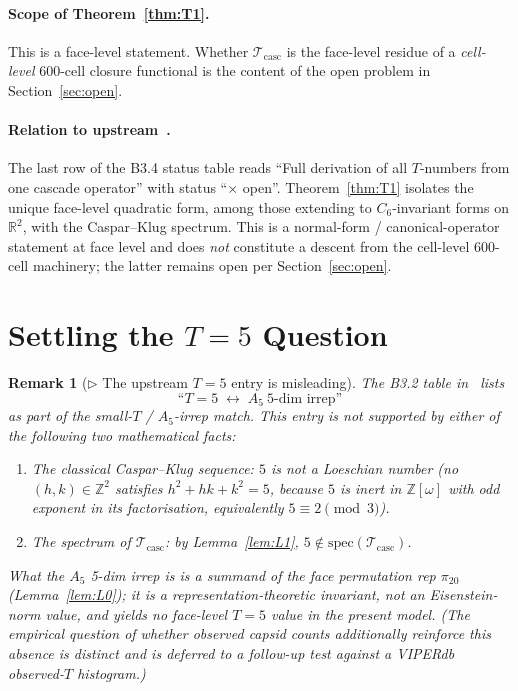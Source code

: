 \documentclass[12pt]{article}
\newtheorem{remark}[theorem]{Remark}
\newcommand{\Tcasc}{\mathcal{T}_{\mathrm{casc}}}
\newcommand{\Zom}{\mathbb{Z}[\omega]}
\begin{document}
\paragraph{Scope of Theorem~\ref{thm:T1}.} This is a face-level
statement. Whether $\Tcasc$ is the face-level residue of a
\emph{cell-level} 600-cell closure functional is the content of the
open problem in Section~\ref{sec:open}.

\paragraph{Relation to upstream~\cite[\S B3.4]{CascadeBio}.} The last
row of the B3.4 status table reads ``Full derivation of all $T$-numbers
from one cascade operator'' with status ``$\times$ open''.
Theorem~\ref{thm:T1} isolates the unique face-level quadratic
form, among those extending to $C_6$-invariant forms on
$\mathbb{R}^2$, with the Caspar--Klug spectrum. This is a
normal-form / canonical-operator statement at face level and does
\emph{not} constitute a descent from the cell-level 600-cell
machinery; the latter remains open per Section~\ref{sec:open}.

\section{Settling the $T = 5$ Question}\label{sec:t5}

\begin{remark}[$\triangleright$ The upstream $T = 5$ entry is misleading]\label{rem:R1}
The B3.2 table in~\cite[\S B3.2]{CascadeBio} lists
\[
\text{``}T = 5 \;\leftrightarrow\; A_5\ \text{5-dim irrep''}
\]
as part of the small-$T$ / $A_5$-irrep match. This entry is not
supported by either of the following two mathematical facts:
\begin{enumerate}
\item[(i)] The classical Caspar--Klug sequence: $5$ is not a Loeschian
number (no $(h, k) \in \mathbb{Z}^2$ satisfies $h^2 + hk + k^2 = 5$,
because $5$ is inert in $\Zom$ with odd exponent in its factorisation,
equivalently $5 \equiv 2 \pmod 3$).
\item[(ii)] The spectrum of $\Tcasc$: by Lemma~\ref{lem:L1}, $5
\notin \mathrm{spec}(\Tcasc)$.
\end{enumerate}
What the $A_5$ 5-dim irrep \emph{is} is a summand of the face
permutation rep $\pi_{20}$ (Lemma~\ref{lem:L0}); it is a
representation-theoretic invariant, not an Eisenstein-norm value,
and yields no face-level $T = 5$ value in the present model. (The
empirical question of whether observed capsid counts additionally
reinforce this absence is distinct and is deferred to a follow-up
test against a VIPERdb observed-$T$ histogram.)
\end{remark}
\end{document}
